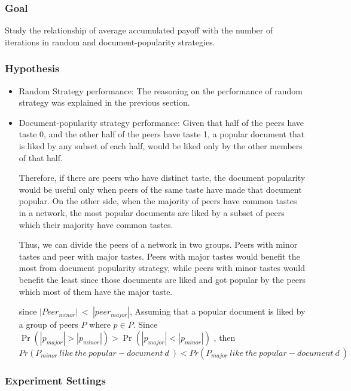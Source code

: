 \documentclass [12pt]{article} \usepackage{multicol}
\begin{document}
\subsubsection{Goal}
 Study the relationship of average accumulated payoff with the number of iterations  in random and document-popularity strategies.
\subsubsection{Hypothesis}

\begin{itemize}
\item Random Strategy performance: The reasoning on the performance of random strategy was explained in the previous section.

\item Document-popularity strategy performance: Given that half of the peers have taste 0, and the other half of the peers have taste 1,
a popular document that is liked by any subset of each half, would be liked only by the other members of that half. 

Therefore, if there are peers who have distinct taste, the document popularity would be useful only when peers of the same taste have made 
that document popular. On the other side, when the majority of peers have common tastes in a network, the most popular documents are liked by
a subset of peers which their majority have common tastes. 

Thus, we can divide the peers of a network in two groups. Peers with minor tastes and peer with major tastes.
Peers with major tastes would benefit the most from document popularity strategy, while peers with minor tastes would benefit the least since 
those documents are liked and got popular by the peers which most of them have the major taste.


since $ |Peer_{minor} |\ <\ |peer_{major}| $, Assuming that a popular document is liked by a group of peers $P$ where ${ p \in P}$. Since
$ \Pr(|p_{major}| > |p_{minor}|) > \Pr(|p_{major}| < |p_{minor}|)$ , then  $Pr(P_{minor}\ like\  the\ popular-document\ d\ )  < Pr(P_{major}\ like\  the\ popular-document\ d\ )     $
 
\end{itemize}

\subsubsection{Experiment Settings}
\end{document}

